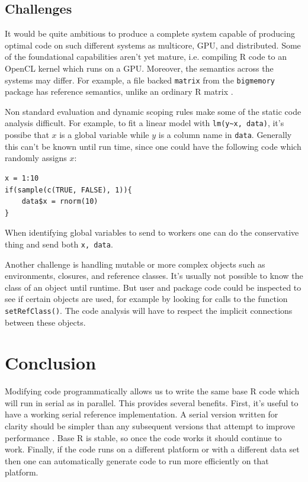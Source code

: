 \documentclass[12pt]{article}
\begin{document}

\subsection{Challenges}

It would be quite ambitious to produce a complete system capable of
producing optimal code on such different systems as multicore, GPU, and
distributed. Some of the foundational capabilities aren't yet mature, i.e.
compiling R code to an OpenCL kernel which runs on a GPU. Moreover, the
semantics across the systems may differ. For example, a file backed
\texttt{matrix} from the \texttt{bigmemory} package has reference
semantics, unlike an ordinary R matrix \cite{bigmemory}.

Non standard evaluation and dynamic scoping rules make some of the
static code analysis difficult. For example, to fit a linear model with
\texttt{lm(y\textasciitilde x, data)}, it's possibe that $x$ is a global variable while
$y$ is a column name in \texttt{data}. Generally this can't be known until
run time, since one could have the following code which randomly assigns
$x$:

\begin{verbatim}
x = 1:10
if(sample(c(TRUE, FALSE), 1)){
    data$x = rnorm(10)
}
\end{verbatim}

When identifying global variables to send to workers one can do the
conservative thing and send both \texttt{x, data}.

Another challenge is handling mutable or more complex objects
such as environments, closures, and reference classes.  It's usually not
possible to know the class of an object until runtime. But user and package
code could be inspected to see if certain objects are used, for example by
looking for calls to the function \texttt{setRefClass()}. The code
analysis will have to respect the implicit connections between these
objects.

\section{Conclusion}

Modifying code programmatically allows us to write the same base R code
which will run in serial as in parallel. This provides several benefits.
First, it's useful to have a working serial reference implementation.  A
serial version written for clarity should be simpler than any subsequent
versions that attempt to improve performance \cite{matloff2015parallel}.
Base R is stable, so once the code works it should continue to work.
Finally, if the code runs on a different platform or with a different data
set then one can automatically generate code to run more efficiently on
that platform.
\end{document}
